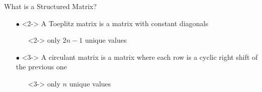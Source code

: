 \begin{frame}{What is a Structured Matrix?}
\begin{minipage}{\textwidth}
  \end{minipage}


  \vspace{0.3cm}

  {\small
  \begin{itemize}[leftmargin=5pt]
    \item[$\bullet$]<2-> A Toeplitz matrix is a matrix with constant diagonals
    \begin{itemize}
      \item[\orange{$\rightarrow$}]<2-> only $2n - 1$ unique values
    \end{itemize}
    \item[$\bullet$]<3-> A circulant matrix is a matrix where each row is a cyclic right shift of the previous one
    \begin{itemize}
      \item[\orange{$\rightarrow$}]<3-> only $n$ unique values
    \end{itemize}
  \end{itemize}
  }

\end{frame}





